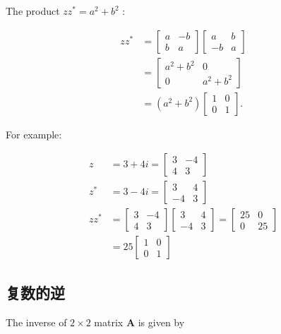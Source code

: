 The product $z z^{*}=a^{2}+b^{2}$ :

$$
\begin{aligned}
z z^{*} & =\left[\begin{array}{cc}
a & -b \\
b & a
\end{array}\right]\left[\begin{array}{cc}
a & b \\
-b & a
\end{array}\right] \\
& =\left[\begin{array}{cc}
a^{2}+b^{2} & 0 \\
0 & a^{2}+b^{2}
\end{array}\right] \\
& =\left(a^{2}+b^{2}\right)\left[\begin{array}{ll}
1 & 0 \\
0 & 1
\end{array}\right] .
\end{aligned}
$$

For example:

$$
\begin{aligned}
z & =3+4 i=\left[\begin{array}{cc}
3 & -4 \\
4 & 3
\end{array}\right] \\
z^{*} & =3-4 i=\left[\begin{array}{cc}
3 & 4 \\
-4 & 3
\end{array}\right] \\
z z^{*} & =\left[\begin{array}{cc}
3 & -4 \\
4 & 3
\end{array}\right]\left[\begin{array}{cc}
3 & 4 \\
-4 & 3
\end{array}\right]=\left[\begin{array}{cc}
25 & 0 \\
0 & 25
\end{array}\right] \\
& =25\left[\begin{array}{cc}
1 & 0 \\
0 & 1
\end{array}\right]
\end{aligned}
$$

\subsection{复数的逆}
The inverse of $2 \times 2$ matrix $\mathbf{A}$ is given by


